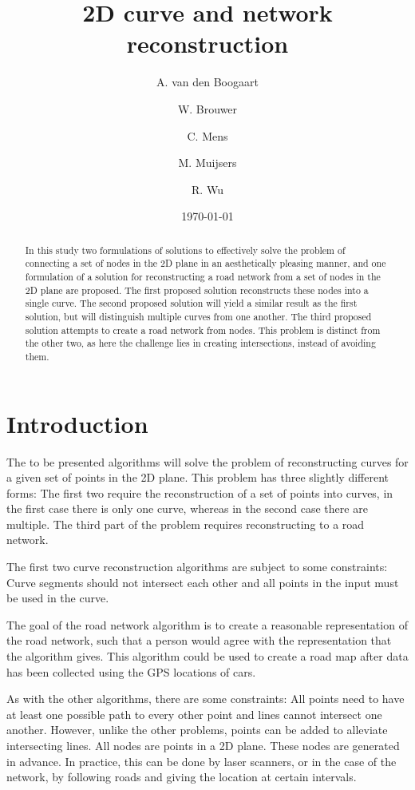 \documentclass[11pt]{article}
\title{2D curve and network reconstruction}
\author{
A. van den Boogaart \and
W. Brouwer \and
C. Mens \and
M. Muijsers \and
R. Wu
}
\date{\today}
\begin{document}
\newpage

\maketitle

\begin{abstract}
In this study  two formulations of solutions to effectively solve the problem of connecting a set of nodes in the 2D plane in an aesthetically pleasing manner, and one formulation of a solution for reconstructing a road network from a set of nodes in the 2D plane are proposed.
The first proposed solution reconstructs these nodes into a single curve.
The second proposed solution will yield a similar result as the first solution, but will distinguish multiple curves from one another.
The third proposed solution attempts to create a road network from nodes. This problem is distinct from the other two, as here the challenge lies in creating intersections, instead of avoiding them.

\end{abstract}

\section{Introduction}
\label{se:introduction}
The to be presented algorithms will solve the problem of reconstructing curves for a given set of points in the 2D plane. This problem has three slightly different forms: The first two require the reconstruction of a set of points into curves, in the first case there is only one curve, whereas in the second case there are multiple. The third part of the problem requires reconstructing to a road network.

The first two curve reconstruction algorithms are subject to some constraints: Curve segments should not intersect each other and all points in the input must be used in the curve.

The goal of the road network algorithm is to create a reasonable representation of the road network, such that a person would agree with the representation that the algorithm gives. This algorithm could be used to create a road map after data has been collected using the GPS locations of cars.

As with the other algorithms, there are some constraints: All points need to have at least one possible path to every other point and lines cannot intersect one another. However, unlike the other problems, points can be added to alleviate intersecting lines. All nodes are points in a 2D plane. These nodes are generated in advance. In practice, this can be done by laser scanners, or in the case of the network, by following roads and giving the location at certain intervals. 
\end{document}
